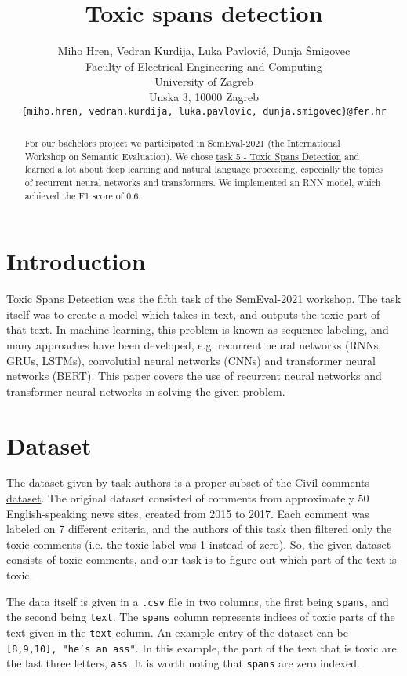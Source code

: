 \documentclass{article}
\title{Toxic spans detection}
\author{
 Miho Hren, Vedran Kurdija, Luka Pavlović, Dunja Šmigovec \\
  Faculty of Electrical Engineering and Computing\\
  University of Zagreb\\
  Unska 3, 10000 Zagreb \\
  \texttt{\{miho.hren, vedran.kurdija, luka.pavlovic, dunja.smigovec\}@fer.hr} \\
}
\begin{document}
\maketitle
\begin{abstract}
For our bachelors project we participated in SemEval-2021 (the International Workshop on Semantic Evaluation). We chose \href{https://sites.google.com/view/toxicspans}{task 5 - Toxic Spans Detection} and learned a lot about deep learning and natural language processing, especially the topics of recurrent neural networks and transformers. We implemented an RNN model, which achieved the F1 score of 0.6.
\end{abstract}




\section{Introduction}
Toxic Spans Detection was the fifth task of the SemEval-2021 workshop. The task itself was to create a model which takes in text, and outputs the toxic part of that text. In machine learning, this problem is known as sequence labeling, and many approaches have been developed, e.g. recurrent neural networks (RNNs, GRUs, LSTMs), convolutial neural networks (CNNs) and transformer neural networks (BERT). This paper covers the use of recurrent neural networks and transformer neural networks in solving the given problem. 

\section{Dataset}
\label{sec:headings}
The dataset given by task authors is a proper subset of the \href{https://www.tensorflow.org/datasets/catalog/civil_comments}{Civil comments dataset}. The original dataset consisted of comments from approximately 50 English-speaking news sites, created from 2015 to 2017. Each comment was labeled on 7 different criteria, and the authors of this task then filtered only the toxic comments (i.e. the toxic label was 1 instead of zero). So, the given dataset consists of toxic comments, and our task is to figure out which part of the text is toxic. 

The data itself is given in a \texttt{.csv} file in two columns, the first being \texttt{spans}, and the second being \texttt{text}. The \texttt{spans} column represents indices of toxic parts of the text given in the \texttt{text} column. An example entry of the dataset can be \texttt{[8,9,10], "he's an ass"}. In this example, the part of the text that is toxic are the last three letters, \texttt{ass}. It is worth noting that \texttt{spans} are zero indexed.
\end{document}
